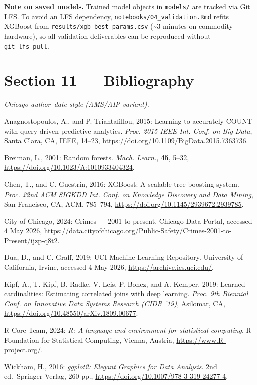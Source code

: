 \documentclass[
  10pt,
  twocolumn,
  10pt]{article}
\begin{document}
\textbf{Note on saved models.} Trained model objects in \texttt{models/}
are tracked via Git LFS. To avoid an LFS dependency,
\texttt{notebooks/04\_validation.Rmd} refits XGBoost from
\texttt{results/xgb\_best\_params.csv} (\textasciitilde3 minutes on
commodity hardware), so all validation deliverables can be reproduced
without \texttt{git\ lfs\ pull}.

\section{Section 11 --- Bibliography}\label{section-11-bibliography}

\emph{Chicago author--date style (AMS/AIP variant).}

Anagnostopoulos, A., and P. Triantafillou, 2015: Learning to accurately
COUNT with query-driven predictive analytics. \emph{Proc. 2015 IEEE Int.
Conf. on Big Data}, Santa Clara, CA, IEEE, 14--23,
\url{https://doi.org/10.1109/BigData.2015.7363736}.

Breiman, L., 2001: Random forests. \emph{Mach. Learn.}, \textbf{45},
5--32, \url{https://doi.org/10.1023/A:1010933404324}.

Chen, T., and C. Guestrin, 2016: XGBoost: A scalable tree boosting
system. \emph{Proc. 22nd ACM SIGKDD Int. Conf. on Knowledge Discovery
and Data Mining}, San Francisco, CA, ACM, 785--794,
\url{https://doi.org/10.1145/2939672.2939785}.

City of Chicago, 2024: Crimes --- 2001 to present. Chicago Data Portal,
accessed 4 May 2026,
\url{https://data.cityofchicago.org/Public-Safety/Crimes-2001-to-Present/ijzp-q8t2}.

Dua, D., and C. Graff, 2019: UCI Machine Learning Repository. University
of California, Irvine, accessed 4 May 2026,
\url{https://archive.ics.uci.edu/}.

Kipf, A., T. Kipf, B. Radke, V. Leis, P. Boncz, and A. Kemper, 2019:
Learned cardinalities: Estimating correlated joins with deep learning.
\emph{Proc. 9th Biennial Conf. on Innovative Data Systems Research (CIDR
'19)}, Asilomar, CA, \url{https://doi.org/10.48550/arXiv.1809.00677}.

R Core Team, 2024: \emph{R: A language and environment for statistical
computing}. R Foundation for Statistical Computing, Vienna, Austria,
\url{https://www.R-project.org/}.

Wickham, H., 2016: \emph{ggplot2: Elegant Graphics for Data Analysis}.
2nd ed.~Springer-Verlag, 260 pp.,
\url{https://doi.org/10.1007/978-3-319-24277-4}.
\end{document}
